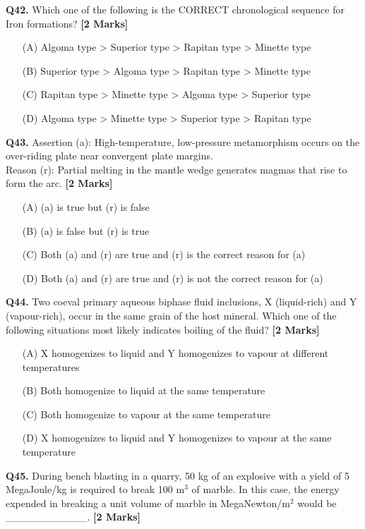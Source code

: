 \documentclass[11pt]{article}
\newcommand{\questionb}[2]{
    \noindent\textbf{Q#2.} #1 \hfill \textbf{[2 Marks]}
}
\begin{document}
\questionb{Which one of the following is the CORRECT chronological sequence for Iron formations?}{42}
\begin{enumerate}
    \item[(A)] Algoma type > Superior type > Rapitan type > Minette type
    \item[(B)] Superior type > Algoma type > Rapitan type > Minette type
    \item[(C)] Rapitan type > Minette type > Algoma type > Superior type
    \item[(D)] Algoma type > Minette type > Superior type > Rapitan type
\end{enumerate}
\vspace{0.5cm}

\questionb{Assertion (a): High-temperature, low-pressure metamorphism occurs on the over-riding plate near convergent plate margins.\\
Reason (r): Partial melting in the mantle wedge generates magmas that rise to form the arc.}{43}
\begin{enumerate}
    \item[(A)] (a) is true but (r) is false
    \item[(B)] (a) is false but (r) is true
    \item[(C)] Both (a) and (r) are true and (r) is the correct reason for (a)
    \item[(D)] Both (a) and (r) are true and (r) is not the correct reason for (a)
\end{enumerate}
\vspace{0.5cm}

\questionb{Two coeval primary aqueous biphase fluid inclusions, X (liquid-rich) and Y (vapour-rich), occur in the same grain of the host mineral. Which one of the following situations most likely indicates boiling of the fluid?}{44}
\begin{enumerate}
    \item[(A)] X homogenizes to liquid and Y homogenizes to vapour at different temperatures
    \item[(B)] Both homogenize to liquid at the same temperature
    \item[(C)] Both homogenize to vapour at the same temperature
    \item[(D)] X homogenizes to liquid and Y homogenizes to vapour at the same temperature
\end{enumerate}
\vspace{0.5cm}

\questionb{During bench blasting in a quarry, 50 kg of an explosive with a yield of 5 MegaJoule/kg is required to break 100 m\(^3\) of marble. In this case, the energy expended in breaking a unit volume of marble in MegaNewton/m\(^2\) would be \_\_\_\_\_\_\_\_\_\_\_.}{45}
\vspace{0.5cm}
\end{document}
